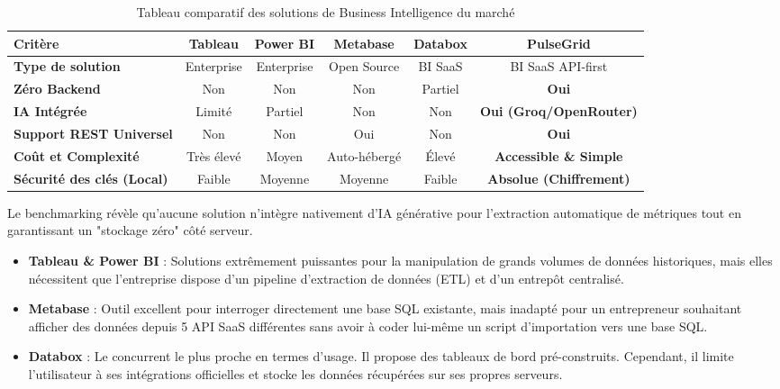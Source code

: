 ﻿\documentclass[12pt,a4paper,oneside]{report} %
\begin{document}
\begin{table}[H]
\centering
\begin{tabularx}{\textwidth}{|l|c|c|c|c|c|}
\hline
\textbf{Critère} & \textbf{Tableau} & \textbf{Power BI} & \textbf{Metabase} & \textbf{Databox} & \textbf{PulseGrid} \\ \hline
\textbf{Type de solution} & Enterprise & Enterprise & Open Source & BI SaaS & BI SaaS API-first \\ \hline
\textbf{Zéro Backend} & Non & Non & Non & Partiel & \textbf{Oui} \\ \hline
\textbf{IA Intégrée} & Limité & Partiel & Non & Non & \textbf{Oui (Groq/OpenRouter)} \\ \hline
\textbf{Support REST Universel} & Non & Non & Oui & Non & \textbf{Oui} \\ \hline
\textbf{Coût et Complexité} & Très élevé & Moyen & Auto-hébergé & Élevé & \textbf{Accessible \& Simple} \\ \hline
\textbf{Sécurité des clés (Local)} & Faible & Moyenne & Moyenne & Faible & \textbf{Absolue (Chiffrement)} \\ \hline
\end{tabularx}
\caption{Tableau comparatif des solutions de Business Intelligence du marché}
\end{table}

Le benchmarking révèle qu'aucune solution n'intègre nativement d'IA générative pour l'extraction automatique de métriques tout en garantissant un "stockage zéro" côté serveur. 

\begin{itemize}
    \item \textbf{Tableau \& Power BI} : Solutions extrêmement puissantes pour la manipulation de grands volumes de données historiques, mais elles nécessitent que l'entreprise dispose d'un pipeline d'extraction de données (ETL) et d'un entrepôt centralisé.
    \item \textbf{Metabase} : Outil excellent pour interroger directement une base SQL existante, mais inadapté pour un entrepreneur souhaitant afficher des données depuis 5 API SaaS différentes sans avoir à coder lui-même un script d'importation vers une base SQL.
    \item \textbf{Databox} : Le concurrent le plus proche en termes d'usage. Il propose des tableaux de bord pré-construits. Cependant, il limite l'utilisateur à ses intégrations officielles et stocke les données récupérées sur ses propres serveurs.
\end{itemize}
\end{document}

